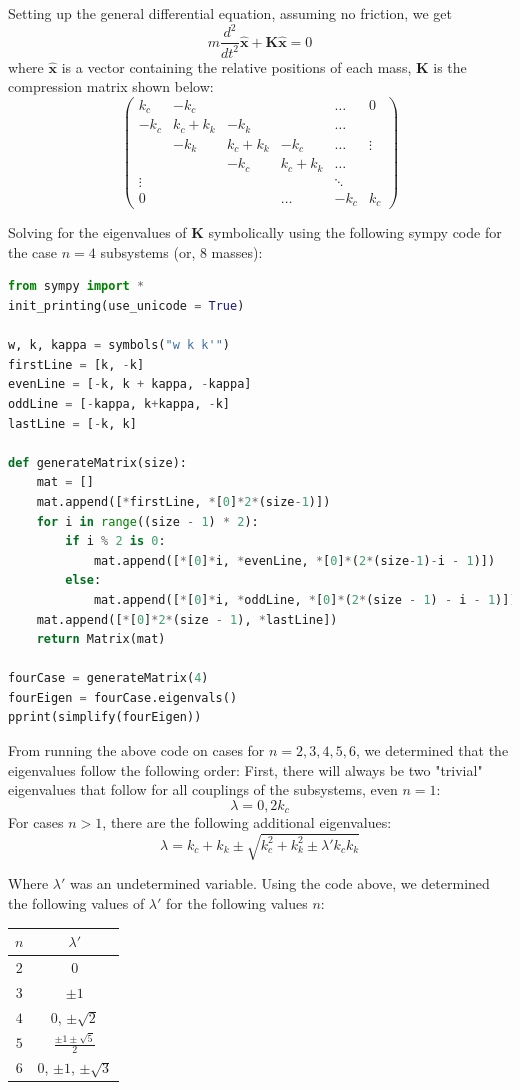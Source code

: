 \documentclass[11pt]{article}
\begin{document}
Setting up the general differential equation, assuming no friction, we get
\[
m\frac{d^2}{dt^2} \mathbf{\hat{x}} + \mathbf{K \hat{x}} = 0
\]
where $\mathbf{\hat{x}}$ is a vector containing the relative positions of each mass, $\mathbf{K}$ is the compression matrix shown below:
\[
\begin{pmatrix}
k_c & -k_c &  &  & \dots & 0\\
-k_c & k_c+k_k & -k_k &  & \dots & \\
 & -k_k & k_c+k_k & -k_c & \dots & \vdots \\
 &  & -k_c & k_c + k_k & \dots & \\
\vdots &  &  &  & \ddots & \\
0 &  &  & \dots & -k_c & k_c
\end{pmatrix}
\]

Solving for the eigenvalues of $\mathbf{K}$ symbolically using the following sympy code for the case $n=4$ subsystems (or, 8 masses):


\begin{lstlisting}[language=Python]
from sympy import *
init_printing(use_unicode = True)

w, k, kappa = symbols("w k k'")
firstLine = [k, -k]
evenLine = [-k, k + kappa, -kappa]
oddLine = [-kappa, k+kappa, -k]
lastLine = [-k, k]

def generateMatrix(size):
    mat = []
    mat.append([*firstLine, *[0]*2*(size-1)])
    for i in range((size - 1) * 2):
        if i % 2 is 0:
            mat.append([*[0]*i, *evenLine, *[0]*(2*(size-1)-i - 1)])
        else:
            mat.append([*[0]*i, *oddLine, *[0]*(2*(size - 1) - i - 1)])
    mat.append([*[0]*2*(size - 1), *lastLine])
    return Matrix(mat)

fourCase = generateMatrix(4)
fourEigen = fourCase.eigenvals()
pprint(simplify(fourEigen))
\end{lstlisting}

From running the above code on cases for $n=2,3,4,5,6$, we determined that the eigenvalues follow the following order: First, there will always be two "trivial" eigenvalues that follow for all couplings of the subsystems, even $n=1$:
\[
\lambda = 0,  2k_c
\]
For cases $n>1$, there are the following additional eigenvalues:
\[
\lambda = k_c + k_k \pm \sqrt{k_c^2 + k_k^2 \pm \lambda' k_c k_k}
\]

Where $\lambda'$ was an undetermined variable. Using the code above, we determined the following values of $\lambda'$ for the following values $n$:

\begin{center}
	\begin{tabular}{ c | c}
		$n$ & $\lambda'$ \\
		\hline
		$2$ & $0$ \\
		$3$ & $\pm 1$\\
		$4$ & $0$, $\pm \sqrt{2}$\\
		$5$ & $\frac{\pm 1 \pm \sqrt{5}}{2}$\\
		$6$ & $0$, $\pm 1$, $\pm \sqrt{3}$
	\end{tabular}
\end{center}
\end{document}
